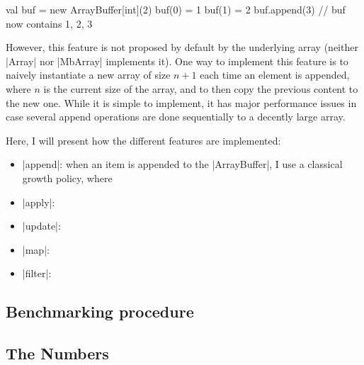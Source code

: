 \begin{lstlisting-nobreak}
 val buf = new ArrayBuffer[int](2)
 buf(0) = 1
 buf(1) = 2
 buf.append(3) // buf now contains {1, 2, 3}
\end{lstlisting-nobreak}

However, this feature is not proposed by default by the underlying array (neither |Array| nor |MbArray| implements it). One way to implement this feature is to naively instantiate a new array of size $n + 1$ each time an element is appended, where $n$ is the current size of the array, and to then copy the previous content to the new one.
While it is simple to implement, it has major performance issues in case several append operations are done sequentially to a decently large array.

 
Here, I will present how the different features are implemented:
\begin{itemize}
  \item |append|: when an item is appended to the |ArrayBuffer|, I use a classical growth policy, where 
  \item |apply|: 
  \item |update|: 
  \item |map|: 
  \item |filter|: 
\end{itemize}

\subsection{Benchmarking procedure}

\subsection{The Numbers}

